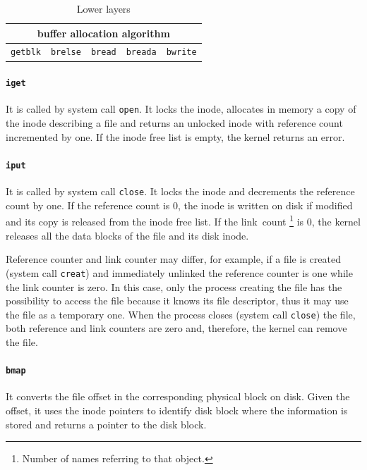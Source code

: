 \begin{table}
\centering
\begin{tabular}{|c|c|c|c|c|}
\hline 
\multicolumn{5}{|c|}{buffer allocation algorithm} \\ 
\hline 
\texttt{getblk} & \texttt{brelse} & \texttt{bread} & \texttt{breada} & \texttt{bwrite} \\ 
\hline 
\end{tabular} 
\caption{Lower layers}
\label{system_mgmt_lower_layers}
\end{table}

\paragraph{\texttt{iget}} It is called by system call \texttt{open}. It locks the inode, allocates in memory a copy of the inode describing a file and returns an unlocked inode with reference count incremented by one. If the inode free list is empty, the kernel returns an error.

\paragraph{\texttt{iput}} It is called by system call \texttt{close}. It locks the inode and decrements the reference count by one. If the reference count is 0, the inode is written on disk if modified and its copy is released from the inode free list. If the link~count \footnote{Number of names referring to that object.} is 0, the kernel releases all the data blocks of the file and its disk inode.

Reference counter and link counter may differ, for example, if a file is created (system call \texttt{creat}) and immediately unlinked the reference counter is one while the link counter is zero. In this case, only the process creating the file has the possibility to access the file because it knows its file descriptor, thus it may use the file as a temporary one. When the process closes (system call \texttt{close}) the file, both reference and link counters are zero and, therefore, the kernel can remove the file.

\paragraph{\texttt{bmap}} It converts the file offset in the corresponding physical block on disk. Given the offset, it uses the inode pointers to identify disk block where the information is stored and returns a pointer to the disk block.

